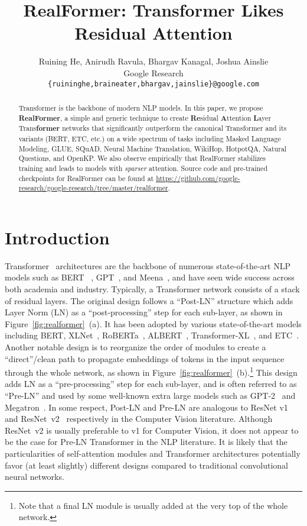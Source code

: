 \documentclass[11pt,a4paper]{article}
\title{RealFormer: Transformer Likes Residual Attention}
\author{Ruining He,  Anirudh Ravula, Bhargav Kanagal, Joshua Ainslie \\
Google Research \\
\texttt{\{ruininghe,braineater,bhargav,jainslie\}@google.com} }
\date{}
\begin{document}
\maketitle

\begin{abstract}
Transformer is the backbone of modern NLP models. In this paper, we propose \textbf{RealFormer}, a simple and generic technique to create \textbf{Re}sidual \textbf{A}ttention \textbf{L}ayer Trans\textbf{former} networks that significantly outperform the canonical Transformer and its variants (BERT, ETC, etc.) on a wide spectrum of tasks including Masked Language Modeling, GLUE, SQuAD, Neural Machine Translation, WikiHop, HotpotQA, Natural Questions, and OpenKP.
We also observe empirically that RealFormer stabilizes training and leads to models with \emph{sparser} attention.
Source code and pre-trained checkpoints for RealFormer can be
found at \url{https://github.com/google-research/google-research/tree/master/realformer}.
\end{abstract}


\section{Introduction}
Transformer~\citep{Vaswani-2017-attention} architectures are the backbone of numerous state-of-the-art NLP models such as BERT ~\citep{Devlin-2019-bert}, GPT~\citep{Radford-2019-gpt2}, and Meena~\citep{Adiwardana-2020-meena}, and have seen wide success across both academia and industry. Typically, a Transformer network consists of a stack of residual layers. The original design follows a ``Post-LN'' structure which adds Layer Norm (LN) as a ``post-processing'' step for each sub-layer, as shown in Figure~\ref{fig:realformer}~(a). It has been adopted by various state-of-the-art models including BERT, XLNet~\citep{Yang-2019-xlnet}, RoBERTa~\citep{Liu-2019-roberta}, ALBERT~\citep{Lan-2019-albert}, Transformer-XL~\citep{Dai-2019-transformerxl}, and ETC~\citep{Ainslie-2020-etc}. Another notable design is to reorganize the order of modules to create a ``direct''/clean path to propagate embeddings of tokens in the input sequence through the whole network, as shown in Figure~\ref{fig:realformer}~(b).\footnote{Note that a final LN module is usually added at the very top of the whole network.} This design adds LN as a ``pre-processing'' step for each sub-layer, and is often referred to as ``Pre-LN'' and used by some well-known extra large models such as GPT-2~\citep{Radford-2019-gpt2} and Megatron~\citep{Shoeybi-2019-megatron}. In some respect, Post-LN and Pre-LN are analogous to ResNet v1~\citep{He-2016-resnetv1} and ResNet~v2~\citep{He-2016-resnetv2} respectively in the Computer Vision literature. Although ResNet~v2 is usually preferable to v1 for Computer Vision, it does not appear to be the case for Pre-LN Transformer in the NLP literature. It is likely that the particularities of self-attention modules and Transformer architectures potentially favor (at least slightly) different designs compared to traditional convolutional neural networks. 
\end{document}
